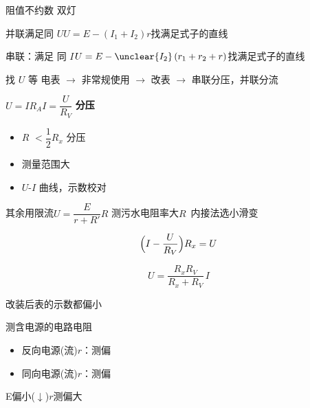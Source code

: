 阻值不约数 %
双灯

并联\quad 满足同 $U$\quad $U=E-(I_1+I_2)r$\quad 找满足式子的直线

串联\quad ：满足 同 $I$\quad $U=E-\unclear{I_2}\,(r_1+r_2+r)$\quad 找满足式子的直线

找 $U$ 等 %
电表 $\to$ 非常规使用 $\to$ 改表 $\to$ 串联分压，并联分流

$U=IR_A$\quad $I=\dfrac{U}{R_V}$
\textbf{分压}
\begin{itemize}
\item $R$ $<\dfrac{1}{2}R_x$ 分压
\item 测量范围大
\item $U$-$I$ 曲线，示数校对 %
\end{itemize}
其余用限流\qquad $U=\dfrac{E}{r+R'}R$
测污水电阻率\quad 大$R$\ 内接法\quad 选小滑变


\[
\Bigl(I-\frac{U}{R_V}\Bigr)R_x=U
\]

\[
U=\frac{R_xR_V}{R_x+R_V}\,I
\]

\quad{}
改装后表的示数都偏小 %


测含电源的电路电阻
\begin{itemize}
\item 反向电源(流)\quad $r$：测偏 %
\item 同向电源(流)\quad $r$：测偏 %
\end{itemize}
E偏小($\downarrow$)\quad $r$测偏大

